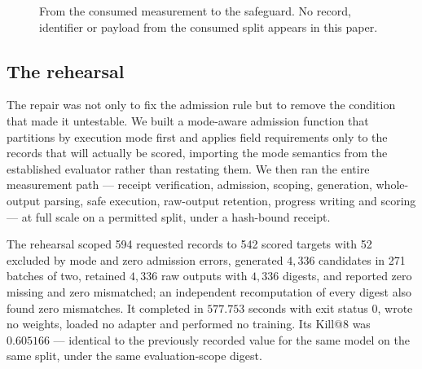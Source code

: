 \documentclass[10pt,conference]{IEEEtran}
\makeatletter
\newcommand{\killk}[1]{Kill@#1}
\makeatother
\begin{document}
\begin{figure}[t]
\centering
{}
\caption{From the consumed measurement to the safeguard. No record, identifier
or payload from the consumed split appears in this paper.}
\label{fig:incident}
\end{figure}

\subsection{The rehearsal}

The repair was not only to fix the admission rule but to remove the condition
that made it untestable. We built a mode-aware admission function that
partitions by execution mode first and applies field requirements only to the
records that will actually be scored, importing the mode semantics from the
established evaluator rather than restating them. We then ran the entire
measurement path --- receipt verification, admission, scoping, generation,
whole-output parsing, safe execution, raw-output retention, progress writing and
scoring --- at full scale on a permitted split, under a hash-bound receipt.

The rehearsal scoped 594 requested records to 542 scored targets with 52
excluded by mode and zero admission errors, generated $4{,}336$ candidates in
271 batches of two, retained $4{,}336$ raw outputs with $4{,}336$ digests, and
reported zero missing and zero mismatched; an independent recomputation of every
digest also found zero mismatches. It completed in $577.753$ seconds with exit
status 0, wrote no weights, loaded no adapter and performed no training. Its
\killk{8} was $0.605166$ --- identical to the previously recorded value for the
same model on the same split, under the same evaluation-scope digest.
\end{document}
